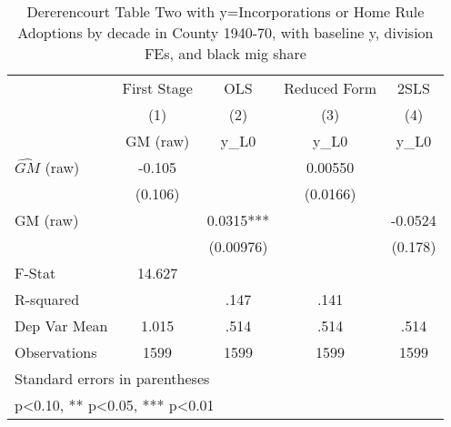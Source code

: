 \begin{table}[htbp]\centering
\def\sym#1{\ifmmode^{#1}\else\(^{#1}\)\fi}
\caption{Dererencourt Table Two with y=Incorporations or Home Rule Adoptions by decade in County 1940-70, with baseline y, division FEs, and black mig share}
\begin{tabular}{l*{4}{c}}
\toprule
                    & First Stage   &         OLS   &Reduced Form   &        2SLS   \\
                    &\multicolumn{1}{c}{(1)}&\multicolumn{1}{c}{(2)}&\multicolumn{1}{c}{(3)}&\multicolumn{1}{c}{(4)}\\
                    &\multicolumn{1}{c}{GM  (raw)}&\multicolumn{1}{c}{y\_L0}&\multicolumn{1}{c}{y\_L0}&\multicolumn{1}{c}{y\_L0}\\
\midrule
$\hat{GM}$ (raw)    &      -0.105   &               &     0.00550   &               \\
                    &     (0.106)   &               &    (0.0166)   &               \\
\addlinespace
GM  (raw)           &               &      0.0315***&               &     -0.0524   \\
                    &               &   (0.00976)   &               &     (0.178)   \\
\midrule
F-Stat              &      14.627   &               &               &               \\
R-squared           &               &        .147   &        .141   &               \\
Dep Var Mean        &       1.015   &        .514   &        .514   &        .514   \\
Observations        &        1599   &        1599   &        1599   &        1599   \\
\bottomrule
\multicolumn{5}{l}{\footnotesize Standard errors in parentheses}\\
\multicolumn{5}{l}{\footnotesize * p<0.10, ** p<0.05, *** p<0.01}\\
\end{tabular}
\end{table}
